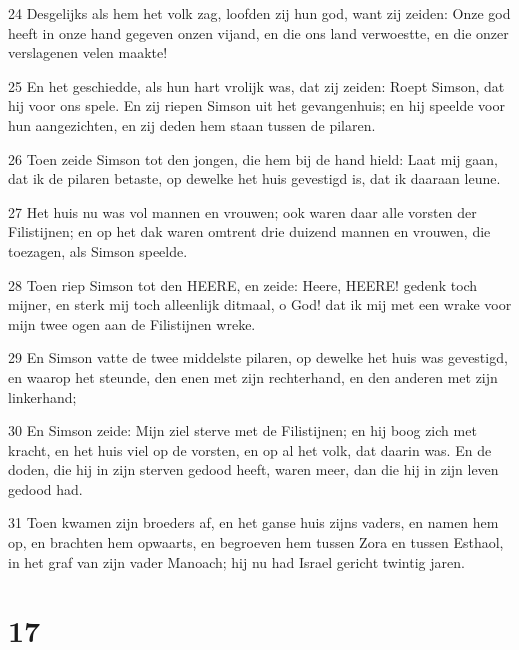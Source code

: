 \par 24 Desgelijks als hem het volk zag, loofden zij hun god, want zij zeiden: Onze god heeft in onze hand gegeven onzen vijand, en die ons land verwoestte, en die onzer verslagenen velen maakte!
\par 25 En het geschiedde, als hun hart vrolijk was, dat zij zeiden: Roept Simson, dat hij voor ons spele. En zij riepen Simson uit het gevangenhuis; en hij speelde voor hun aangezichten, en zij deden hem staan tussen de pilaren.
\par 26 Toen zeide Simson tot den jongen, die hem bij de hand hield: Laat mij gaan, dat ik de pilaren betaste, op dewelke het huis gevestigd is, dat ik daaraan leune.
\par 27 Het huis nu was vol mannen en vrouwen; ook waren daar alle vorsten der Filistijnen; en op het dak waren omtrent drie duizend mannen en vrouwen, die toezagen, als Simson speelde.
\par 28 Toen riep Simson tot den HEERE, en zeide: Heere, HEERE! gedenk toch mijner, en sterk mij toch alleenlijk ditmaal, o God! dat ik mij met een wrake voor mijn twee ogen aan de Filistijnen wreke.
\par 29 En Simson vatte de twee middelste pilaren, op dewelke het huis was gevestigd, en waarop het steunde, den enen met zijn rechterhand, en den anderen met zijn linkerhand;
\par 30 En Simson zeide: Mijn ziel sterve met de Filistijnen; en hij boog zich met kracht, en het huis viel op de vorsten, en op al het volk, dat daarin was. En de doden, die hij in zijn sterven gedood heeft, waren meer, dan die hij in zijn leven gedood had.
\par 31 Toen kwamen zijn broeders af, en het ganse huis zijns vaders, en namen hem op, en brachten hem opwaarts, en begroeven hem tussen Zora en tussen Esthaol, in het graf van zijn vader Manoach; hij nu had Israel gericht twintig jaren.

\chapter{17}

